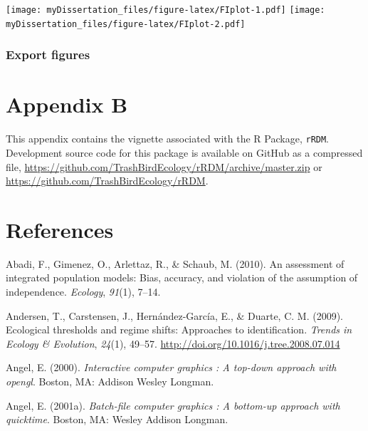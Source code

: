 \documentclass[12pt,twoside]{reedthesis}
\begin{document}
\texttt{[image: myDissertation\_files/figure-latex/FIplot-1.pdf]}
\texttt{[image: myDissertation\_files/figure-latex/FIplot-2.pdf]}

\subsection{Export figures}\label{export-figures}

\chapter*{Appendix B}\label{rRDM}

This appendix contains the vignette associated with the R Package,
\texttt{rRDM}. Development source code for this package is available on
GitHub as a compressed file,
\url{https://github.com/TrashBirdEcology/rRDM/archive/master.zip} or
\url{https://github.com/TrashBirdEcology/rRDM}.

\backmatter

\chapter*{References}\label{references}


\noindent

\setlength{\parindent}{-0.20in} \setlength{\leftskip}{0.20in}
\setlength{\parskip}{8pt}

\hypertarget{refs}{}
\hypertarget{ref-abadi2010assessment}{}
Abadi, F., Gimenez, O., Arlettaz, R., \& Schaub, M. (2010). An
assessment of integrated population models: Bias, accuracy, and
violation of the assumption of independence. \emph{Ecology},
\emph{91}(1), 7--14.

\hypertarget{ref-andersen_ecological_2009}{}
Andersen, T., Carstensen, J., Hernández-García, E., \& Duarte, C. M.
(2009). Ecological thresholds and regime shifts: Approaches to
identification. \emph{Trends in Ecology \& Evolution}, \emph{24}(1),
49--57. \url{http://doi.org/10.1016/j.tree.2008.07.014}

\hypertarget{ref-angel2000}{}
Angel, E. (2000). \emph{Interactive computer graphics : A top-down
approach with opengl}. Boston, MA: Addison Wesley Longman.

\hypertarget{ref-angel2001}{}
Angel, E. (2001a). \emph{Batch-file computer graphics : A bottom-up
approach with quicktime}. Boston, MA: Wesley Addison Longman.
\end{document}

